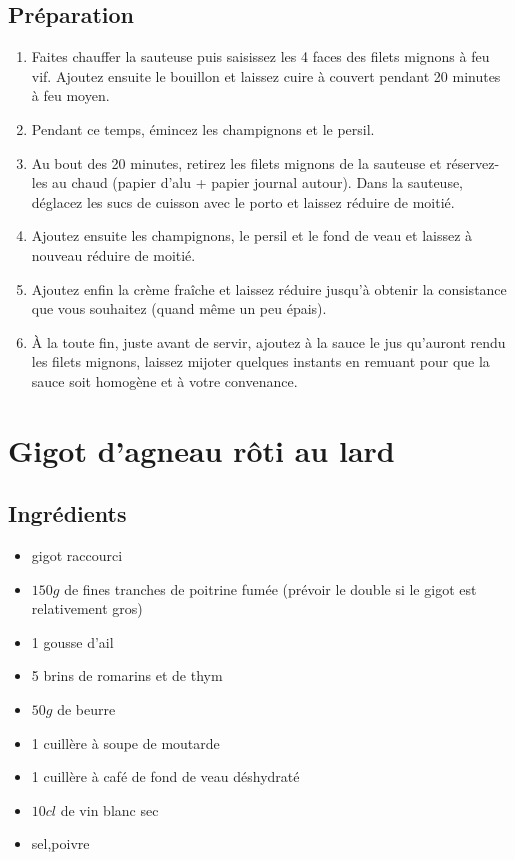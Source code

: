 \subsection*{Préparation}
\begin{enumerate}
\item Faites chauffer la sauteuse puis saisissez les 4 faces des filets mignons à feu vif. Ajoutez ensuite le bouillon et laissez cuire à couvert pendant 20 minutes à feu moyen.
\item Pendant ce temps, émincez les champignons et le persil.
\item Au bout des 20 minutes, retirez les filets mignons de la sauteuse et réservez-les au chaud (papier d'alu + papier journal autour). Dans la sauteuse, déglacez les sucs de cuisson avec le porto et laissez réduire de moitié.
\item Ajoutez ensuite les champignons, le persil et le fond de veau et laissez à nouveau réduire de moitié.
\item Ajoutez enfin la crème fraîche et laissez réduire jusqu'à obtenir la consistance que vous souhaitez (quand même un peu épais).
\item À la toute fin, juste avant de servir, ajoutez à la sauce le jus qu'auront rendu les filets mignons, laissez mijoter quelques instants en remuant pour que la sauce soit homogène et à votre convenance.
\end{enumerate}


\newpage
\section{Gigot d'agneau rôti au lard}
\subsection*{Ingrédients}
\begin{itemize}
\item gigot raccourci
\item $150\unit{g}$ de fines tranches de poitrine fumée (prévoir le double si le gigot est relativement gros)
\item 1 gousse d'ail
\item 5 brins de romarins et de thym
\item $50\unit{g}$ de beurre
\item 1 cuillère à soupe de moutarde
\item 1 cuillère à café de fond de veau déshydraté
\item $10\unit{cl}$ de vin blanc sec
\item sel,poivre
\end{itemize}

